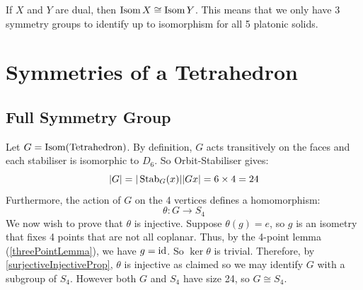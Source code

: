 \documentclass[../main.tex]{subfiles}
\begin{document}
If $X$ and $Y$ are dual, then $\operatorname{Isom} X \cong \operatorname{Isom} Y$.
This means that we only have 3 symmetry groups to identify up to isomorphism for all 5 platonic solids.
\section{Symmetries of a Tetrahedron}
\subsection{Full Symmetry Group}
\begin{center}
\end{center}
Let $G = \operatorname{Isom}(\text{Tetrahedron})$.
By definition, $G$ acts transitively on the faces and each stabiliser is isomorphic to $D_6$.
So Orbit-Stabiliser gives:
\[
  |G| = |\operatorname{Stab}_G(x)||Gx| = 6 \times 4 = 24
\]
Furthermore, the action of $G$ on the 4 vertices defines a homomorphism:
\[
  \theta: G \to S_4
\]
We now wish to prove that $\theta$ is injective.
Suppose $\theta(g) = e$, so $g$ is an isometry that fixes 4 points that are not all coplanar.
Thus, by the 4-point lemma (\cref{threePointLemma}), we have $g = \mathrm{id}$.
So $\ker \theta$ is trivial.
Therefore, by \cref{surjectiveInjectiveProp}, $\theta$ is injective as claimed so we may identify $G$ with a subgroup of $S_4$.
However both $G$ and $S_4$ have size 24, so $G \cong S_4$.
\end{document}
